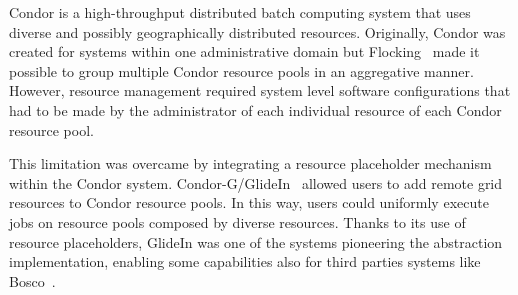 \documentclass{sig-alternate}
\begin{document}

 Condor is a high-throughput distributed batch
computing system that uses diverse and possibly geographically distributed
resources. Originally, Condor was created for systems within one administrative
domain but Flocking~\cite{Epema:1996:flocking} made it possible to group
multiple Condor resource pools in an aggregative manner. However, resource
management required system level software configurations that had to be made by
the administrator of each individual resource of each Condor resource pool.


This limitation was overcame by integrating a resource placeholder mechanism
within the Condor system. Condor-G/GlideIn~\cite{condor-g} allowed users to add
remote grid resources to Condor resource pools. In this way, users could
uniformly execute jobs on resource pools composed by diverse resources. Thanks
to its use of resource placeholders, GlideIn was one of the systems
pioneering the \pilot abstraction implementation, enabling some \pilot
capabilities also for third parties systems like Bosco~\cite{bosco}.

 

\end{document}
